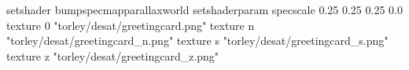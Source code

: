 setshader bumpspecmapparallaxworld
setshaderparam specscale 0.25 0.25 0.25 0.0
texture 0 "torley/desat/greetingcard.png"
texture n "torley/desat/greetingcard_n.png"
texture s "torley/desat/greetingcard_s.png"
texture z "torley/desat/greetingcard_z.png"

